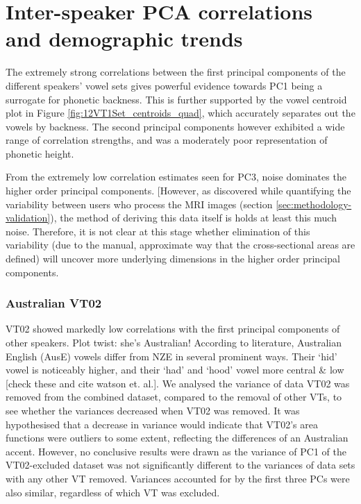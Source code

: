 \section{Inter-speaker PCA correlations and demographic trends}

The extremely strong correlations between the first principal components of the different speakers' vowel sets gives powerful evidence towards PC1 being a surrogate for phonetic backness. This is further supported by the vowel centroid plot in Figure \ref{fig:12VT1Set_centroids_quad}, which accurately separates out the vowels by backness. The second principal components however exhibited a wide range of correlation strengths, and was a moderately poor representation of phonetic height. 

From the extremely low correlation estimates seen for PC3, noise dominates the higher order principal components. [However, as discovered while quantifying the variability between users who process the MRI images (section \ref{sec:methodology-validation}), the method of deriving this data itself is holds at least this much noise. Therefore, it is not clear at this stage whether elimination of this variability (due to the manual, approximate way that the cross-sectional areas are defined) will uncover more underlying dimensions in the higher order principal components. 

\subsubsection{Australian VT02}

VT02 showed markedly low correlations with the first principal components of other speakers. Plot twist: she's Australian! According to literature, Australian English (AusE) vowels differ from NZE in several prominent ways. Their `hid' vowel is noticeably higher, and their `had' and `hood' vowel more central \& low [check these and cite watson et. al.]. We analysed the variance of data VT02 was removed from the combined dataset, compared to the removal of other VTs, to see whether the variances decreased when VT02 was removed. It was hypothesised that a decrease in variance would indicate that VT02's area functions were outliers to some extent, reflecting the differences of an Australian accent. However, no conclusive results were drawn as the variance of PC1 of the VT02-excluded dataset was not significantly different to the variances of data sets with any other VT removed. Variances accounted for by the first three PCs were also similar, regardless of which VT was excluded.

